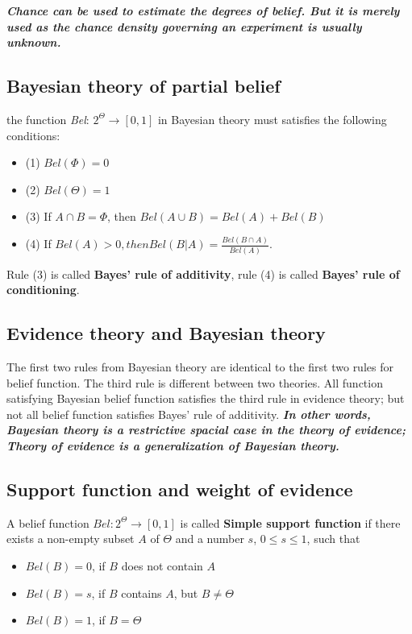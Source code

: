 \documentclass[11pt]{article}
\begin{document}
\textbf{\emph{Chance can be used to estimate the degrees of belief. But it is merely used as
the chance density governing an experiment is usually unknown.}}

\subsection{Bayesian theory of partial belief}
\label{sec:org67d756d}
the function \emph{Bel}: \(2^\Theta \rightarrow [0,1]\) in Bayesian theory must satisfies the following conditions:

\begin{itemize}
\item (1) \(Bel (\Phi)=0\)
\item (2) \(Bel (\Theta) = 1\)
\item (3) If \(A\cap B = \Phi\), then \(Bel(A\cup B) = Bel(A) + Bel(B)\)
\item (4) If \(Bel(A)>0, then Bel(B|A) =\frac{Bel(B\cap A)}{Bel(A)}\).
\end{itemize}

Rule (3) is called \textbf{Bayes' rule of additivity}, rule (4) is called \textbf{Bayes' rule
of conditioning}.

\subsection{Evidence theory and Bayesian theory}
\label{sec:org05d5cdc}

The first two rules from Bayesian theory are identical to the first two rules for
belief function. The third rule is different between two theories. All function
satisfying Bayesian belief function satisfies the third rule in evidence theory;
but not all belief function satisfies Bayes' rule of additivity. \textbf{\emph{In other words, Bayesian theory is a restrictive spacial case in the theory of evidence; Theory of evidence is a generalization of Bayesian theory.}}



\subsection{Support function and weight of evidence}
\label{sec:org5255cfe}

A belief function \(Bel:2^\Theta \rightarrow [0,1]\) is called \textbf{Simple support
function} if there exists a non-empty subset \(A\) of \(\Theta\) and a number \(s\),
\(0\le s \le 1\), such that
\begin{itemize}
\item \(Bel(B) = 0\), if \(B\) does not contain \(A\)
\item \(Bel(B) = s\), if \(B\) contains \(A\), but \(B \ne \Theta\)
\item \(Bel(B) = 1\), if \(B = \Theta\)
\end{itemize}
\end{document}
